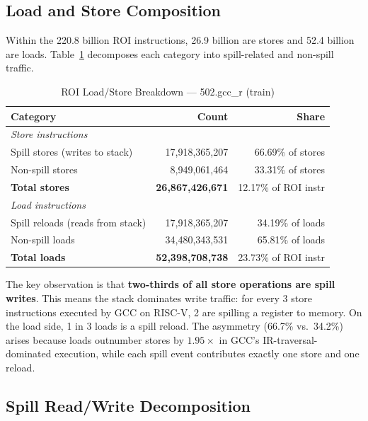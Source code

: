 \documentclass[conference]{IEEEtran}
\begin{document}
\subsection{Load and Store Composition}

Within the 220.8 billion ROI instructions, 26.9 billion are stores
and 52.4 billion are loads. Table~\ref{tab:lsbreakdown} decomposes
each category into spill-related and non-spill traffic.

\begin{table}[H]
\centering
\caption{ROI Load/Store Breakdown --- 502.gcc\_r (train)}
\label{tab:lsbreakdown}
\begin{tabular}{lrr}
\toprule
\textbf{Category} & \textbf{Count} & \textbf{Share} \\
\midrule
\multicolumn{3}{l}{\textit{Store instructions}} \\
\quad Spill stores (writes to stack)    & 17,918,365,207 & 66.69\% of stores \\
\quad Non-spill stores                  &  8,949,061,464 & 33.31\% of stores \\
\quad \textbf{Total stores}             & \textbf{26,867,426,671} & 12.17\% of ROI instr \\
\midrule
\multicolumn{3}{l}{\textit{Load instructions}} \\
\quad Spill reloads (reads from stack)  & 17,918,365,207 & 34.19\% of loads \\
\quad Non-spill loads                   & 34,480,343,531 & 65.81\% of loads \\
\quad \textbf{Total loads}              & \textbf{52,398,708,738} & 23.73\% of ROI instr \\
\bottomrule
\end{tabular}
\end{table}

The key observation is that \textbf{two-thirds of all store operations
are spill writes}. This means the stack dominates write traffic: for
every 3 store instructions executed by GCC on RISC-V, 2 are spilling
a register to memory. On the load side, 1 in 3 loads is a spill
reload. The asymmetry (66.7\% vs.\ 34.2\%) arises because loads
outnumber stores by $1.95\times$ in GCC's IR-traversal-dominated
execution, while each spill event contributes exactly one store and
one reload.

\subsection{Spill Read/Write Decomposition}
\end{document}
